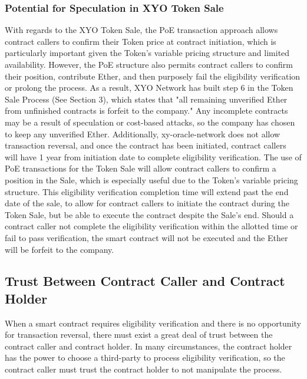 \documentclass{article}
\begin{document}
\subsubsection{Potential for Speculation in XYO Token Sale}
With regards to the XYO Token Sale, the PoE transaction approach allows contract callers to confirm their Token price at contract initiation, which is particularly important given the Token's variable pricing structure and limited availability. However, the PoE structure also permits contract callers to confirm their position, contribute Ether, and then purposely fail the eligibility verification or prolong the process. As a result, XYO Network has built step 6 in the Token Sale Process (See Section 3), which states that "all remaining unverified Ether from unfinished contracts is forfeit to the company." Any incomplete contracts may be a result of speculation or cost-based attacks, so the company has chosen to keep any unverified Ether. Additionally, \acrlong{xy-oracle-network} does not allow transaction reversal, and once the contract has been initiated, contract callers will have 1 year from initiation date to complete eligibility verification. The use of PoE transactions for the Token Sale will allow contract callers to confirm a position in the Sale, which is especially useful due to the Token's variable pricing structure. This eligibility verification completion time will extend past the end date of the sale, to allow for contract callers to initiate the contract during the Token Sale, but be able to execute the contract despite the Sale's end. Should a contract caller not complete the eligibility verification within the allotted time or fail to pass verification, the smart contract will not be executed and the Ether will be forfeit to the company.

\subsection{Trust Between Contract Caller and Contract Holder}

When a smart contract requires eligibility verification and there is no opportunity for transaction reversal, there must exist a great deal of trust between the contract caller and contract holder. In many circumstances, the contract holder has the power to choose a third-party to process eligibility verification, so the contract caller must trust the contract holder to not manipulate the process.


\clearpage

\printglossaries
\end{document}
